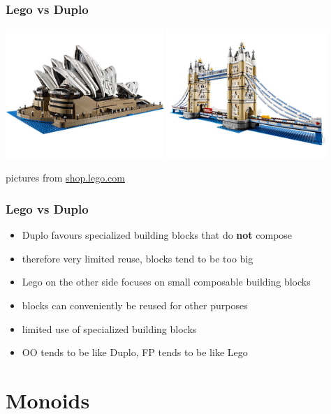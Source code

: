 \documentclass{beamer}
\begin{document}
\begin{frame}
  \frametitle{Lego vs Duplo}
  \begin{center}
    \includegraphics[width=0.45\textwidth]{../images/lego-sydney-opera.jpg}
    \includegraphics[width=0.45\textwidth]{../images/lego-tower-bridge.jpg}
  \end{center}
  \vfill
  \begin{center}
    {\tiny pictures from \url{shop.lego.com}}
  \end{center}
\end{frame}

\begin{frame}
  \frametitle{Lego vs Duplo}
  \begin{itemize}
  \item Duplo favours specialized building blocks that do
    \textbf{not} compose
  \item therefore very limited reuse, blocks tend to be too big
  \item Lego on the other side focuses on small composable building
    blocks
  \item blocks can conveniently be reused for other purposes
  \item limited use of specialized building blocks
  \item OO tends to be like Duplo, FP tends to be like Lego
  \end{itemize}
\end{frame}

\section{Monoids}
\end{document}
